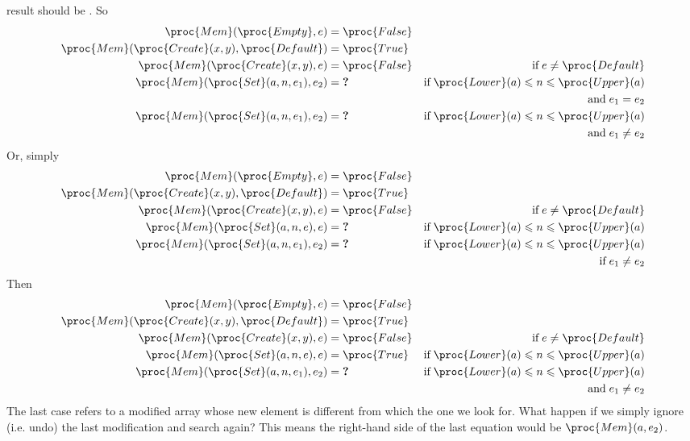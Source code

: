 \begin{itemize}
    result should be . So
    \begin{align*}
        \proc{Mem} (\proc{Empty}, e)
     &= \proc{False}\\
        \proc{Mem} (\proc{Create} (x, y), \proc{Default})
     &= \proc{True}\\
        \proc{Mem} (\proc{Create} (x, y), e)
     &= \proc{False}
     & \text{if} \; e \neq \proc{Default}\\
        \proc{Mem} (\proc{Set} (a, n, e_1), e_2)
     &= \textbf{?}
     & \text{if} \; \proc{Lower} (a) \leqslant n \leqslant
       \proc{Upper} (a)\\
     && \text{and} \; e_1 = e_2\\
        \proc{Mem} (\proc{Set} (a, n, e_1), e_2)
     &= \textbf{?}
     & \text{if} \; \proc{Lower} (a) \leqslant n \leqslant
     \proc{Upper} (a)\\
     && \text{and} \; e_1 \neq e_2
    \end{align*}
    Or, simply
    \begin{align*}
        \proc{Mem} (\proc{Empty}, e)
     &= \proc{False}\\
        \proc{Mem} (\proc{Create} (x, y), \proc{Default})
     &= \proc{True}\\
        \proc{Mem} (\proc{Create} (x, y), e)
     &= \proc{False}
     & \text{if} \; e \neq \proc{Default}\\
        \proc{Mem} (\proc{Set} (a, n, e), e)
     &= \textbf{?}
     & \text{if} \; \proc{Lower} (a) \leqslant n \leqslant
     \proc{Upper} (a)\\
        \proc{Mem} (\proc{Set} (a, n, e_1), e_2)
     &= \textbf{?}
     & \text{if} \; \proc{Lower} (a) \leqslant n \leqslant
     \proc{Upper} (a)\\
     && \text{if} \; e_1 \neq e_2
    \end{align*}
    Then
    \begin{align*}
        \proc{Mem} (\proc{Empty}, e)
     &= \proc{False}\\
        \proc{Mem} (\proc{Create} (x, y), \proc{Default})
     &= \proc{True}\\
        \proc{Mem} (\proc{Create} (x, y), e)
     &= \proc{False}
     & \text{if} \; e \neq \proc{Default}\\
        \proc{Mem} (\proc{Set} (a, n, e), e)
     &= \proc{True}
     & \text{if} \; \proc{Lower} (a) \leqslant n \leqslant
     \proc{Upper} (a)\\
        \proc{Mem} (\proc{Set} (a, n, e_1), e_2)
     &= \textbf{?}
     & \text{if} \; \proc{Lower} (a) \leqslant n \leqslant
     \proc{Upper} (a)\\
     && \text{and} \; e_1 \neq e_2\\
    \end{align*}
    The last case refers to a modified array whose new element is
    different from which the one we look for. What happen if we simply
    ignore  (i.e. undo) the last modification and search again? This
    means the right-hand side of the last equation would be
    \(\proc{Mem} (a, e_2)\).


\end{itemize}
